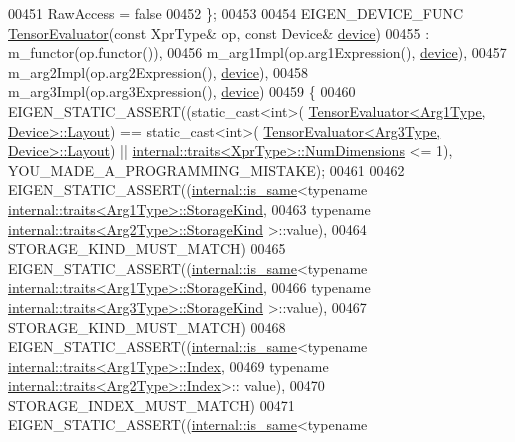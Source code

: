 \begin{DoxyCode}
00451     RawAccess = \textcolor{keyword}{false}
00452   \};
00453 
00454   EIGEN\_DEVICE\_FUNC \hyperlink{struct_eigen_1_1_tensor_evaluator}{TensorEvaluator}(\textcolor{keyword}{const} XprType& op, \textcolor{keyword}{const} Device& 
      \hyperlink{struct_eigen_1_1_tensor_evaluator_a98b51809ed8f7a1f736eb7b952b9636e}{device})
00455     : m\_functor(op.functor()),
00456       m\_arg1Impl(op.arg1Expression(), \hyperlink{struct_eigen_1_1_tensor_evaluator_a98b51809ed8f7a1f736eb7b952b9636e}{device}),
00457       m\_arg2Impl(op.arg2Expression(), \hyperlink{struct_eigen_1_1_tensor_evaluator_a98b51809ed8f7a1f736eb7b952b9636e}{device}),
00458       m\_arg3Impl(op.arg3Expression(), \hyperlink{struct_eigen_1_1_tensor_evaluator_a98b51809ed8f7a1f736eb7b952b9636e}{device})
00459   \{
00460     EIGEN\_STATIC\_ASSERT((static\_cast<int>(
      \hyperlink{struct_eigen_1_1_tensor_evaluator}{TensorEvaluator<Arg1Type, Device>::Layout}) == static\_cast<int>(
      \hyperlink{struct_eigen_1_1_tensor_evaluator}{TensorEvaluator<Arg3Type, Device>::Layout}) || 
      \hyperlink{struct_eigen_1_1internal_1_1traits}{internal::traits<XprType>::NumDimensions} <= 1), 
      YOU\_MADE\_A\_PROGRAMMING\_MISTAKE);
00461 
00462     EIGEN\_STATIC\_ASSERT((\hyperlink{struct_eigen_1_1internal_1_1is__same}{internal::is\_same}<\textcolor{keyword}{typename} 
      \hyperlink{struct_eigen_1_1internal_1_1traits}{internal::traits<Arg1Type>::StorageKind},
00463                          \textcolor{keyword}{typename} \hyperlink{struct_eigen_1_1internal_1_1traits}{internal::traits<Arg2Type>::StorageKind}
      >::value),
00464                         STORAGE\_KIND\_MUST\_MATCH)
00465     EIGEN\_STATIC\_ASSERT((\hyperlink{struct_eigen_1_1internal_1_1is__same}{internal::is\_same}<\textcolor{keyword}{typename} 
      \hyperlink{struct_eigen_1_1internal_1_1traits}{internal::traits<Arg1Type>::StorageKind},
00466                          \textcolor{keyword}{typename} \hyperlink{struct_eigen_1_1internal_1_1traits}{internal::traits<Arg3Type>::StorageKind}
      >::value),
00467                         STORAGE\_KIND\_MUST\_MATCH)
00468     EIGEN\_STATIC\_ASSERT((\hyperlink{struct_eigen_1_1internal_1_1is__same}{internal::is\_same}<\textcolor{keyword}{typename} 
      \hyperlink{struct_eigen_1_1internal_1_1traits}{internal::traits<Arg1Type>::Index},
00469                          \textcolor{keyword}{typename} \hyperlink{struct_eigen_1_1internal_1_1traits}{internal::traits<Arg2Type>::Index}>::
      value),
00470                         STORAGE\_INDEX\_MUST\_MATCH)
00471     EIGEN\_STATIC\_ASSERT((\hyperlink{struct_eigen_1_1internal_1_1is__same}{internal::is\_same}<\textcolor{keyword}{typename} 

\end{DoxyCode}
